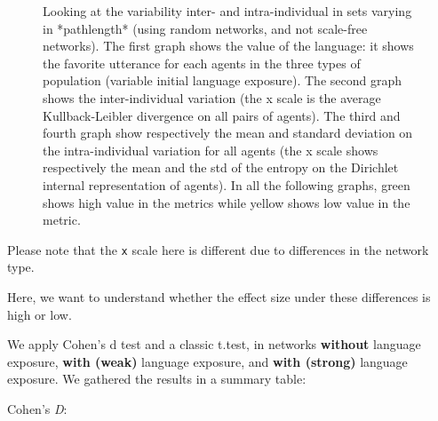 \documentclass[
]{article}
\begin{document}
\begin{figure}[!H]
\caption{Looking at the variability inter- and intra-individual in sets varying in *pathlength* (using random networks, and not scale-free networks). The first graph shows the value of the language: it shows the favorite utterance for each agents in the three types of population (variable initial language exposure). The second graph shows the  inter-individual variation (the x scale is the average Kullback-Leibler divergence on all pairs of agents). The third and fourth graph show respectively the mean and standard deviation on the intra-individual variation for all agents (the x scale shows respectively the mean and the std of the entropy on the Dirichlet internal representation of agents). In all the following graphs, green shows high value in the metrics while yellow shows low value in the metric.}\label{fig:unnamed-chunk-32}
\end{figure}

Please note that the \texttt{x} scale here is different due to
differences in the network type.

Here, we want to understand whether the effect size under these
differences is high or low.

We apply Cohen's d test and a classic t.test, in networks
\textbf{without} language exposure, \textbf{with (weak)} language
exposure, and \textbf{with (strong)} language exposure. We gathered the
results in a summary table:

Cohen's \emph{D}:
\end{document}
